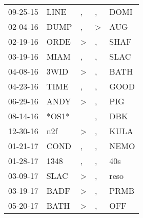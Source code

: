 \begin{supertabular}{p{0.07\textwidth}p{0.06\textwidth}p{0.02\textwidth}p{0.02\textwidth}p{0.06\textwidth}}
          09-25-15\textsuperscript{} &           LINE\textsuperscript{} &                , &                , &           DOMI\textsuperscript{} \\
          02-04-16\textsuperscript{} &           DUMP\textsuperscript{} &                , &     \textgreater &            AUG\textsuperscript{} \\
          02-19-16\textsuperscript{} &           ORDE\textsuperscript{} &     \textgreater &                , &           SHAF\textsuperscript{} \\
          03-19-16\textsuperscript{} &           MIAM\textsuperscript{} &                , &                , &           SLAC\textsuperscript{} \\
          04-08-16\textsuperscript{} &           3WID\textsuperscript{} &     \textgreater &                , &           BATH\textsuperscript{} \\
          04-23-16\textsuperscript{} &           TIME\textsuperscript{} &                , &                , &           GOOD\textsuperscript{} \\
          06-29-16\textsuperscript{} &           ANDY\textsuperscript{} &     \textgreater &                , &            PIG\textsuperscript{} \\
          08-14-16\textsuperscript{} &                            *OS1* &                  &                , &            DBK\textsuperscript{} \\
          12-30-16\textsuperscript{} &            n2f\textsuperscript{} &     \textgreater &                , &           KULA\textsuperscript{} \\
          01-21-17\textsuperscript{} &           COND\textsuperscript{} &                , &                , &           NEMO\textsuperscript{} \\
          01-28-17\textsuperscript{} &           1348\textsuperscript{} &                , &                , &            40s\textsuperscript{} \\
          03-09-17\textsuperscript{} &           SLAC\textsuperscript{} &     \textgreater &                , &           reso\textsuperscript{} \\
          03-19-17\textsuperscript{} &           BADF\textsuperscript{} &     \textgreater &                , &           PRMB\textsuperscript{} \\
          05-20-17\textsuperscript{} &           BATH\textsuperscript{} &     \textgreater &                , &            OFF\textsuperscript{} \\

\end{supertabular}
